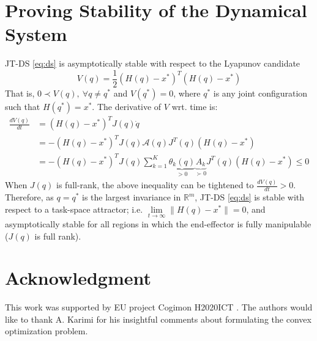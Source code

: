 \documentclass[letterpaper, 10 pt, conference,fleqn]{ieeeconf}
\begin{document}
{\footnotesize
\appendices
\section{Proving Stability of the Dynamical System}
\label{appendix:stability}
JT-DS \eqref{eq:ds} is asymptotically stable with respect to the Lyapunov candidate
\[ V(q) = \frac{1}{2}(H(q) - x^*)^T(H(q) - x^*) \]
That is, $ 0 \prec V(q),~ \forall q \neq q^*$ and $ V(q^*) = 0 $, where $q^*$ is any joint configuration such that $H(q^*) = x^*$.  The derivative of $ V $ wrt. time is:
\begin{equation}
\begin{aligned}
\frac{dV(q)}{dt} &= (H(q) - x^*)^TJ(q)\dot{q}\\
&= -(H(q) - x^*)^TJ(q)\mathcal{A}(q)J^T(q)(H(q) - x^*)\\
&= -(H(q) - x^*)^TJ(q)\sum_{k=1}^{K}\underbrace{\theta_k(q)}_{> 0}\underbrace{A_k}_{\succ 0}J^T(q)(H(q) - x^*)\leq 0
\end{aligned}
\end{equation}
When $J(q)$ is full-rank, the above inequality can be tightened to $\frac{dV(q)}{dt} > 0$. Therefore, as $ q=q^* $ is the largest invariance in $ \mathbb{R}^m $, JT-DS \eqref{eq:ds} is stable with respect to a task-space attractor; i.e. $\lim\limits_{t\rightarrow \infty} \| H(q)-x^*\|=0 $, and asymptotically stable for all regions in which the end-effector is fully manipulable ($J(q)$ is full rank).
}
\section*{Acknowledgment}
\footnotesize
This work was supported by EU project Cogimon H2020\textendash ICT . The authors would like to thank A. Karimi for his insightful comments about formulating the convex optimization problem.



%



\end{document}
